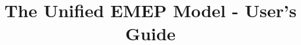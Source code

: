 \documentclass[a4paper,12pt]{report}
\begin{document}

\title{The Unified EMEP Model - User's Guide}
\maketitle

\tableofcontents








%
%
%
%
%
%
%
%
%
%
%
%

\end{document}
